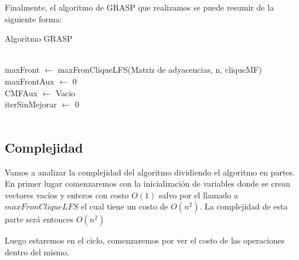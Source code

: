 Finalmente, el algoritmo de GRASP que realizamos se puede resumir de la siguiente forma:

\begin{algorithm}[H]
\begin{algorithmic}
\caption{Algoritmo GRASP}
		\State{}\\
		maxFront $\leftarrow$ maxFronCliqueLFS(Matriz de adyacencias, n, cliqueMF)\\
		maxFrontAux $\leftarrow$ 0\\
		CMFAux $\leftarrow$ Vacio\\
		iterSinMejorar $\leftarrow$ 0\\
		 \\
	\EndFunction
\end{algorithmic}
\end{algorithm} 

\subsection{Complejidad}

Vamos a analizar la complejidad del algoritmo dividiendo el algoritmo en partes. En primer lugar comenzaremos con la inicialización de variables donde se crean vectores vacíos y enteros con costo $O(1)$ salvo por el llamado a $maxFronCliqueLFS$ el cual tiene un costo de $O(n^2)$. La complejidad de esta parte será entonces $O(n^2)$

Luego estaremos en el ciclo, comenzaremos por ver el costo de las operaciones dentro del mismo.

